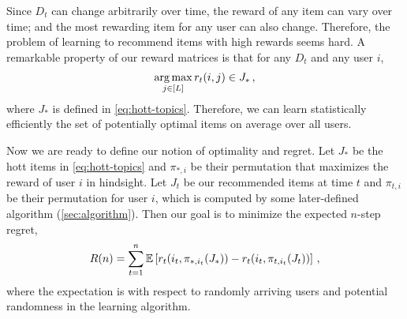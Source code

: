 Since $D_t$ can change arbitrarily over time, the reward of any item can vary over time; and the most rewarding item for any user can also change. Therefore, the problem of learning to recommend items with high rewards seems hard. A remarkable property of our reward matrices is that for any $D_t$ and any user $i$,
\begin{align*}
  \mathop{\rm arg\,max}_{j \in [L]} r_t(i, j) \in J_\ast\,,
\end{align*}
where $J_\ast$ is defined in \ref{eq:hott-topics}. Therefore, we can learn statistically efficiently the set of potentially optimal items on average over all users.

Now we are ready to define our notion of optimality and regret. Let $J_\ast$ be the hott items in \ref{eq:hott-topics} and $\pi_{\ast, i}$ be their permutation that maximizes the reward of user $i$ in hindsight. Let $J_t$ be our recommended items at time $t$ and $\pi_{t, i}$ be their permutation for user $i$, which is computed by some later-defined algorithm (\ref{sec:algorithm}). Then our goal is to minimize the expected $n$-step regret,
\begin{align*}
  R(n) =
  \sum_{t = 1}^n \mathbb{E}\left[r_t(i_t, \pi_{\ast, i_t}(J_\ast)) - r_t(i_t, \pi_{t, i_t}(J_t))\right]\,,
\end{align*}
where the expectation is with respect to randomly arriving users and potential randomness in the learning algorithm.
